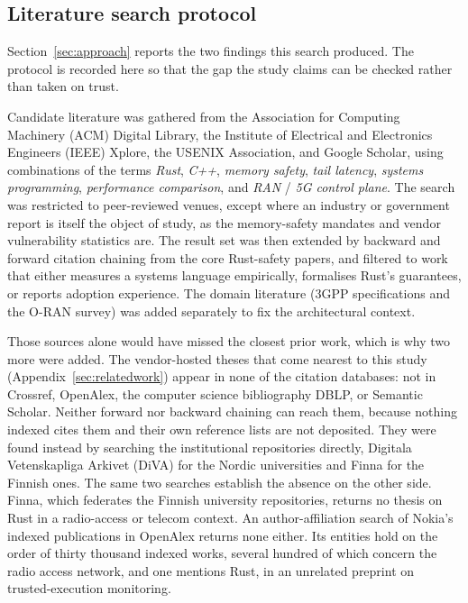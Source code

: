 \documentclass[english,oneside,a4paper,censored,csm,software-track-2020]{HYthesisML}
\begin{document}
\begin{appendices}
\section{Literature search protocol\label{appendix:search}}
Section~\ref{sec:approach} reports the two findings this search produced. The protocol is recorded
here so that the gap the study claims can be checked rather than taken on trust.

Candidate literature was gathered from the Association for Computing Machinery (ACM) Digital
Library, the Institute of Electrical and Electronics Engineers (IEEE) Xplore, the USENIX
Association, and Google Scholar, using combinations of the terms \emph{Rust}, \emph{C++}, \emph{memory safety}, \emph{tail
latency}, \emph{systems programming}, \emph{performance comparison}, and \emph{RAN} / \emph{5G
control plane}. The search was restricted to peer-reviewed venues, except where an industry or
government report is itself the object of study, as the memory-safety mandates and vendor
vulnerability statistics are.
The result set was then extended by backward and forward citation chaining from the core
Rust-safety papers, and filtered to work that either measures a systems language empirically,
formalises Rust's guarantees, or reports adoption experience. The domain literature (3GPP specifications and
the O-RAN survey) was added separately to fix the architectural context.

Those sources alone would have missed the closest prior work, which is why two more were added.
The vendor-hosted theses that come nearest to this study (Appendix~\ref{sec:relatedwork}) appear in
none of the citation databases: not in Crossref, OpenAlex, the computer science bibliography
DBLP, or Semantic Scholar. Neither
forward nor backward chaining can reach them, because nothing indexed cites them and their own
reference lists are not deposited. They were found instead by searching the institutional
repositories directly, Digitala Vetenskapliga Arkivet (DiVA) for the Nordic universities and
Finna for the Finnish ones. The same
two searches establish the absence on the other side. Finna, which federates the Finnish
university repositories, returns no thesis on Rust in a radio-access or telecom context. An
author-affiliation search of Nokia's indexed publications in OpenAlex returns none either. Its
entities hold on the order of thirty thousand indexed works, several hundred of which concern the
radio access network, and one mentions Rust, in an unrelated preprint on trusted-execution
monitoring.


\end{appendices}
\end{document}
